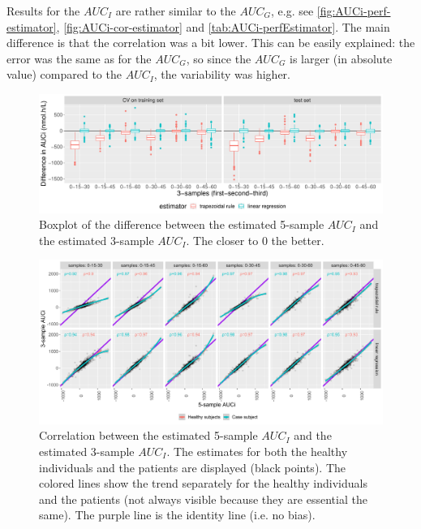 \documentclass[12pt]{article}
\begin{document}
Results for the \(AUC_I\) are rather similar to the \(AUC_G\),
e.g. see \autoref{fig:AUCi-perf-estimator},
\autoref{fig:AUCi-cor-estimator} and \autoref{tab:AUCi-perfEstimator}. The
main difference is that the correlation was a bit lower. This can be
easily explained: the error was the same as for the \(AUC_G\), so
since the \(AUC_G\) is larger (in absolute value) compared to the
\(AUC_I\), the variability was higher. 

\begin{figure}[!h]
\centering
\includegraphics[width=1\textwidth]{./figures/AUCi-perf-boxplot.pdf}
\caption{\label{fig:AUCi-perf-estimator}Boxplot of the difference between the estimated 5-sample \(AUC_I\) and the estimated 3-sample \(AUC_I\). The closer to 0 the better.}
\end{figure}

\begin{figure}[!h]
\centering
\includegraphics[width=1\textwidth]{./figures/AUCi-perf-cor.pdf}
\caption{\label{fig:AUCi-cor-estimator}Correlation between the estimated 5-sample \(AUC_I\) and the estimated 3-sample \(AUC_I\). The estimates for both the healthy individuals and the patients are displayed (black points). The colored lines show the trend separately for the healthy individuals and the patients (not always visible because they are essential the same). The purple line is the identity line (i.e. no bias).}
\end{figure}
\end{document}
